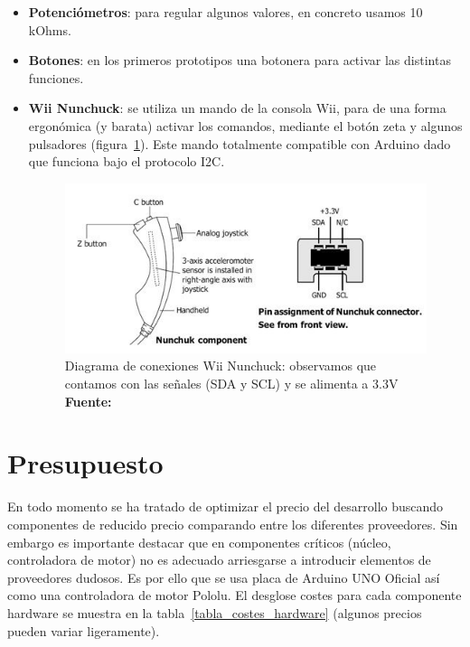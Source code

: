 \begin{itemize}
\begin{itemize}
	\item \textbf{Potenciómetros}: para regular algunos valores, en concreto usamos 10 kOhms.
	\item \textbf{Botones}: en los primeros prototipos una botonera para activar las distintas funciones.
	\item \textbf{Wii Nunchuck}: se utiliza un mando de la consola Wii, para de una forma ergonómica (y barata) activar los comandos, mediante el botón zeta y algunos pulsadores (figura~\ref{fig:nunchuck}). Este mando totalmente compatible con Arduino dado que funciona bajo el protocolo I2C.
		
	\begin{figure}
		\centering
		\includegraphics[width=1\linewidth]{../images/nunchuck}
		\caption[Diagrama de conexiones Wii Nunchuck]
		{Diagrama de conexiones Wii Nunchuck: observamos que contamos con las señales (SDA y SCL) y se alimenta a 3.3V  \textbf{Fuente:} \cite{nunchuck_diagram}}
		\label{fig:nunchuck}
	\end{figure}
	 
\end{itemize}


\section{Presupuesto}

En todo momento se ha tratado de optimizar el precio del desarrollo buscando componentes de reducido precio comparando entre los diferentes proveedores. Sin embargo es importante destacar que en componentes críticos (núcleo, controladora de motor) no es adecuado arriesgarse a introducir elementos de proveedores dudosos. Es por ello que se usa placa de Arduino UNO Oficial así como una controladora de motor Pololu. El desglose costes para cada componente hardware se muestra en la tabla~\ref{tabla_costes_hardware} (algunos precios pueden variar ligeramente).


\end{itemize}
